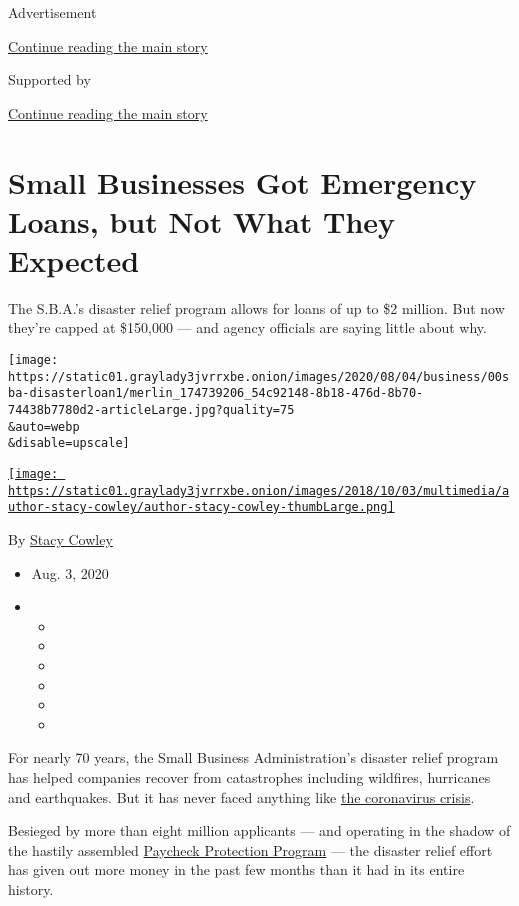 Advertisement

\protect\hyperlink{after-top}{Continue reading the main story}

Supported by

\protect\hyperlink{after-sponsor}{Continue reading the main story}

\hypertarget{small-businesses-got-emergency-loans-but-not-what-they-expected}{%
\section{Small Businesses Got Emergency Loans, but Not What They
Expected}\label{small-businesses-got-emergency-loans-but-not-what-they-expected}}

The S.B.A.'s disaster relief program allows for loans of up to \$2
million. But now they're capped at \$150,000 --- and agency officials
are saying little about why.

\texttt{[image: https://static01.graylady3jvrrxbe.onion/images/2020/08/04/business/00sba-disasterloan1/merlin\_174739206\_54c92148-8b18-476d-8b70-74438b7780d2-articleLarge.jpg?quality=75\\\&auto=webp\\\&disable=upscale]}

\href{https://www.nytimes3xbfgragh.onion/by/stacy-cowley}{\texttt{[image: https://static01.graylady3jvrrxbe.onion/images/2018/10/03/multimedia/author-stacy-cowley/author-stacy-cowley-thumbLarge.png]}}

By \href{https://www.nytimes3xbfgragh.onion/by/stacy-cowley}{Stacy
Cowley}

\begin{itemize}
\item
  Aug. 3, 2020
\item
  \begin{itemize}
  \item
  \item
  \item
  \item
  \item
  \item
  \end{itemize}
\end{itemize}

For nearly 70 years, the Small Business Administration's disaster relief
program has helped companies recover from catastrophes including
wildfires, hurricanes and earthquakes. But it has never faced anything
like
\href{https://www.nytimes3xbfgragh.onion/news-event/coronavirus}{the
coronavirus crisis}.

Besieged by more than eight million applicants --- and operating in the
shadow of the hastily assembled
\href{https://www.nytimes3xbfgragh.onion/2020/04/26/business/ppp-small-business-loans.html}{Paycheck
Protection Program} --- the disaster relief effort has given out more
money in the past few months than it had in its entire history.

